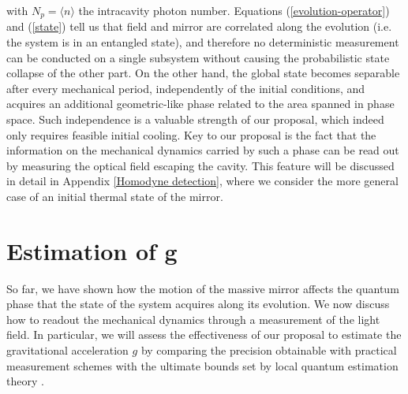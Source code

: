 \documentclass[aps,twocolumn,preprintnumbers,amsmath,amssymb]{revtex4}
\begin{document}
with $N_p=\langle n\rangle$ the intracavity photon number. Equations (\ref{evolution-operator}) and (\ref{state}) tell us that field and mirror are correlated along the evolution (i.e. the system is in an entangled state), and therefore no deterministic measurement can be conducted on a single subsystem without causing the probabilistic state collapse of the other part. On the other hand, the global state becomes separable after every mechanical period, independently of the initial conditions, and acquires an additional geometric-like phase related to the area spanned in phase space. Such independence is a valuable strength of our proposal, which indeed only requires feasible initial cooling. Key to our proposal is the fact that the information on the mechanical dynamics carried by such a phase can be read out by measuring the optical field escaping the cavity. This feature will be discussed in detail in Appendix \ref{Homodyne detection}, where we consider the more general case of an initial thermal state of the mirror.\\

\noindent
\section{Estimation of \MakeLowercase{g}} 
So far, we have shown how the motion of the massive mirror affects the quantum phase that the state of the system acquires along its evolution. We now discuss how to readout the mechanical dynamics through a measurement of the light field. In particular, we will assess the effectiveness of our proposal to estimate the gravitational acceleration $g$ by comparing the precision obtainable with practical measurement schemes with the ultimate bounds set by local quantum estimation theory \cite{paris2009}.
\end{document}
